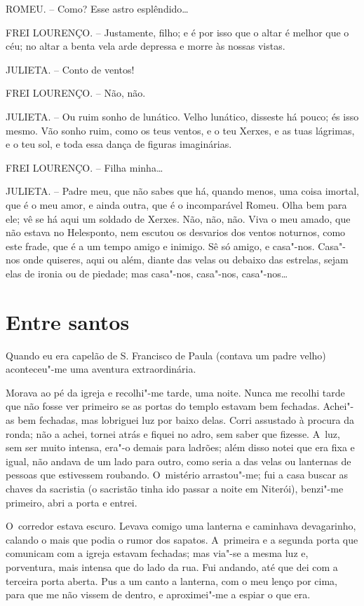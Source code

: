 ROMEU. -- Como? Esse astro esplêndido\ldots{}

FREI LOURENÇO. -- Justamente, filho; e é por isso que o altar é melhor
que o céu; no altar a benta vela arde depressa e morre às nossas vistas.

JULIETA. -- Conto de ventos!

FREI LOURENÇO. -- Não, não.

JULIETA. -- Ou ruim sonho de lunático. Velho lunático, disseste há
pouco; és isso mesmo. Vão sonho ruim, como os teus ventos, e o teu
Xerxes, e as tuas lágrimas, e o teu sol, e toda essa dança de figuras
imaginárias.

FREI LOURENÇO. -- Filha minha\ldots{}

JULIETA. -- Padre meu, que não sabes que há, quando menos, uma coisa
imortal, que é o meu amor, e ainda outra, que é o incomparável Romeu.
Olha bem para ele; vê se há aqui um soldado de Xerxes. Não, não, não.
Viva o meu amado, que não estava no Helesponto, nem escutou os desvarios
dos ventos noturnos, como este frade, que é a um tempo amigo e inimigo.
Sê só amigo, e casa"-nos. Casa"-nos onde quiseres, aqui ou além, diante
das velas ou debaixo das estrelas, sejam elas de ironia ou de piedade;
mas casa"-nos, casa"-nos, casa"-nos\ldots{}

\chapter{Entre santos}

Quando eu era capelão de S. Francisco de Paula (contava um padre velho)
aconteceu"-me uma aventura extraordinária.

Morava ao pé da igreja e recolhi"-me tarde, uma noite. Nunca me recolhi
tarde que não fosse ver primeiro se as portas do templo estavam bem
fechadas. Achei"-as bem fechadas, mas lobriguei luz por baixo delas.
Corri assustado à procura da ronda; não a achei, tornei atrás e fiquei
no adro, sem saber que fizesse. A~luz, sem ser muito intensa, era"-o
demais para ladrões; além disso notei que era fixa e igual, não andava
de um lado para outro, como seria a das velas ou lanternas de pessoas
que estivessem roubando. O~mistério arrastou"-me; fui a casa buscar as
chaves da sacristia (o sacristão tinha ido passar a noite em Niterói),
benzi"-me primeiro, abri a porta e entrei.

O~corredor estava escuro. Levava comigo uma lanterna e caminhava
devagarinho, calando o mais que podia o rumor dos sapatos. A~primeira e
a segunda porta que comunicam com a igreja estavam fechadas; mas via"-se
a mesma luz e, porventura, mais intensa que do lado da rua. Fui andando,
até que dei com a terceira porta aberta. Pus a um canto a lanterna, com
o meu lenço por cima, para que me não vissem de dentro, e aproximei"-me a
espiar o que era.

